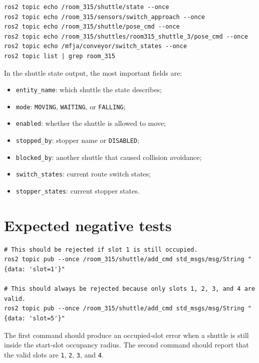 \documentclass[12pt,a4paper]{report}
\newcommand{\codenext}[1]{\par\Needspace{#1\baselineskip}}
\begin{document}
\codenext{10}
\begin{lstlisting}[style=terminalcode,caption={Runtime state and debug topics.}]
ros2 topic echo /room_315/shuttle/state --once
ros2 topic echo /room_315/sensors/switch_approach --once
ros2 topic echo /room_315/shuttle/pose_cmd --once
ros2 topic echo /room_315/shuttles/room315_shuttle_3/pose_cmd --once
ros2 topic echo /mfja/conveyor/switch_states --once
ros2 topic list | grep room_315
\end{lstlisting}

In the shuttle state output, the most important fields are:

\begin{itemize}
\item \texttt{entity\_name}: which shuttle the state describes;
\item \texttt{mode}: \texttt{MOVING}, \texttt{WAITING}, or \texttt{FALLING};
\item \texttt{enabled}: whether the shuttle is allowed to move;
\item \texttt{stopped\_by}: stopper name or \texttt{DISABLED};
\item \texttt{blocked\_by}: another shuttle that caused collision avoidance;
\item \texttt{switch\_states}: current route switch states;
\item \texttt{stopper\_states}: current stopper states.
\end{itemize}

\section{Expected negative tests}

\codenext{10}
\begin{lstlisting}[style=terminalcode,caption={Negative tests for start-slot rules.}]
# This should be rejected if slot 1 is still occupied.
ros2 topic pub --once /room_315/shuttle/add_cmd std_msgs/msg/String "{data: 'slot=1'}"

# This should always be rejected because only slots 1, 2, 3, and 4 are valid.
ros2 topic pub --once /room_315/shuttle/add_cmd std_msgs/msg/String "{data: 'slot=5'}"
\end{lstlisting}

The first command should produce an occupied-slot error when a shuttle is still
inside the start-slot occupancy radius. The second command should report that
the valid slots are \texttt{1}, \texttt{2}, \texttt{3}, and \texttt{4}.
\end{document}
